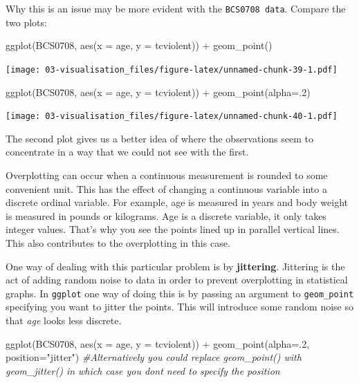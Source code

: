 \documentclass[
]{book}
\newenvironment{Shaded}{\begin{snugshade}}{\end{snugshade}}
\newcommand{\AttributeTok}[1]{\textcolor[rgb]{0.77,0.63,0.00}{#1}}
\newcommand{\CommentTok}[1]{\textcolor[rgb]{0.56,0.35,0.01}{\textit{#1}}}
\newcommand{\DecValTok}[1]{\textcolor[rgb]{0.00,0.00,0.81}{#1}}
\newcommand{\FunctionTok}[1]{\textcolor[rgb]{0.00,0.00,0.00}{#1}}
\newcommand{\NormalTok}[1]{#1}
\newcommand{\SpecialCharTok}[1]{\textcolor[rgb]{0.00,0.00,0.00}{#1}}
\newcommand{\StringTok}[1]{\textcolor[rgb]{0.31,0.60,0.02}{#1}}
\begin{document}
Why this is an issue may be more evident with the \texttt{BCS0708\ data}. Compare the two plots:

\begin{Shaded}
\begin{Highlighting}[]
\FunctionTok{ggplot}\NormalTok{(BCS0708, }\FunctionTok{aes}\NormalTok{(}\AttributeTok{x =}\NormalTok{ age, }\AttributeTok{y =}\NormalTok{ tcviolent)) }\SpecialCharTok{+}
  \FunctionTok{geom\_point}\NormalTok{()}
\end{Highlighting}
\end{Shaded}

\texttt{[image: 03-visualisation\_files/figure-latex/unnamed-chunk-39-1.pdf]}

\begin{Shaded}
\begin{Highlighting}[]
\FunctionTok{ggplot}\NormalTok{(BCS0708, }\FunctionTok{aes}\NormalTok{(}\AttributeTok{x =}\NormalTok{ age, }\AttributeTok{y =}\NormalTok{ tcviolent)) }\SpecialCharTok{+}
  \FunctionTok{geom\_point}\NormalTok{(}\AttributeTok{alpha=}\NormalTok{.}\DecValTok{2}\NormalTok{)}
\end{Highlighting}
\end{Shaded}

\texttt{[image: 03-visualisation\_files/figure-latex/unnamed-chunk-40-1.pdf]}

The second plot gives us a better idea of where the observations seem to concentrate in a way that we could not see with the first.

Overplotting can occur when a continuous measurement is rounded to some convenient unit. This has the effect of changing a continuous variable into a discrete ordinal variable. For example, age is measured in years and body weight is measured in pounds or kilograms. Age is a discrete variable, it only takes integer values. That's why you see the points lined up in parallel vertical lines. This also contributes to the overplotting in this case.

One way of dealing with this particular problem is by \textbf{jittering}. Jittering is the act of adding random noise to data in order to prevent overplotting in statistical graphs. In \texttt{ggplot} one way of doing this is by passing an argument to \texttt{geom\_point} specifying you want to jitter the points. This will introduce some random noise so that \emph{age} looks less discrete.

\begin{Shaded}
\begin{Highlighting}[]
\FunctionTok{ggplot}\NormalTok{(BCS0708, }\FunctionTok{aes}\NormalTok{(}\AttributeTok{x =}\NormalTok{ age, }\AttributeTok{y =}\NormalTok{ tcviolent)) }\SpecialCharTok{+}
  \FunctionTok{geom\_point}\NormalTok{(}\AttributeTok{alpha=}\NormalTok{.}\DecValTok{2}\NormalTok{, }\AttributeTok{position=}\StringTok{"jitter"}\NormalTok{) }\CommentTok{\#Alternatively you could replace geom\_point() with geom\_jitter() in which case you don\textquotesingle{}t need to specify the position}
\end{Highlighting}
\end{Shaded}
\end{document}
